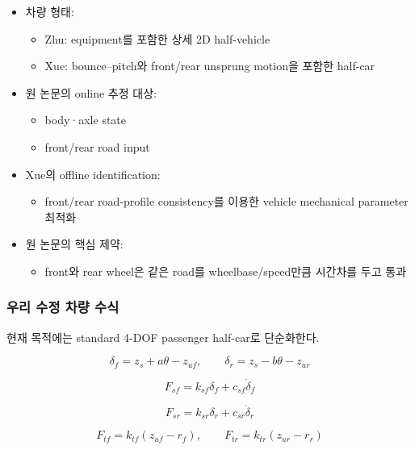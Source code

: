 \documentclass[letterpaper,10pt,journal,twocolumn]{ieeeconf}
\begin{document}
\begin{itemize}

\item
  차량 형태:

  \begin{itemize}
  
  \item
    Zhu: equipment를 포함한 상세 2D half-vehicle
  \item
    Xue: bounce--pitch와 front/rear unsprung motion을 포함한 half-car
  \end{itemize}
\item
  원 논문의 online 추정 대상:

  \begin{itemize}
  
  \item
    body·axle state
  \item
    front/rear road input
  \end{itemize}
\item
  Xue의 offline identification:

  \begin{itemize}
  
  \item
    front/rear road-profile consistency를 이용한 vehicle mechanical parameter 최적화
  \end{itemize}
\item
  원 논문의 핵심 제약:

  \begin{itemize}
  
  \item
    front와 rear wheel은 같은 road를 wheelbase/speed만큼 시간차를 두고 통과
  \end{itemize}
\end{itemize}

\subsubsection{우리 수정 차량 수식}

현재 목적에는 standard 4-DOF passenger half-car로 단순화한다.

\[
\delta_f=z_s+a\theta-z_{uf},
\qquad
\delta_r=z_s-b\theta-z_{ur}
\]

\[
F_{sf}
=
k_{sf}\delta_f
+c_{sf}\dot\delta_f
\]

\[
F_{sr}
=
k_{sr}\delta_r
+c_{sr}\dot\delta_r
\]

\[
F_{tf}
=
k_{tf}(z_{uf}-r_f),
\qquad
F_{tr}
=
k_{tr}(z_{ur}-r_r)
\]
\end{document}

